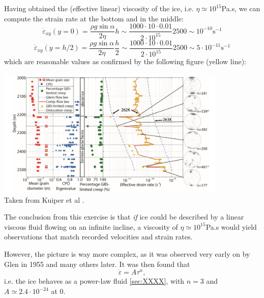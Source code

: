Having obtained the (effective linear) viscosity of the ice, i.e. $\eta\simeq 10^{15}$Pa.s,
we can compute the strain rate at the bottom and in the middle:
\[
\dot{\varepsilon}_{xy}(y=0) 
= \frac{\rho g \sin \alpha}{2 \eta} h
\sim \frac{1000\cdot 10 \cdot 0.01}{2 \cdot 10^{15}}2500
\sim 10^{-10}\text{s}^{-1}
\]
\[
\dot{\varepsilon}_{xy}(y=h/2) 
= \frac{\rho g \sin \alpha}{2 \eta} \frac{h}{2}
\sim \frac{1000\cdot 10 \cdot 0.01}{2 \cdot 10^{15}}2500
\sim 5\cdot 10^{-11}\text{s}^{-1}
\]
which are reasonable values as confirmed by the following figure (yellow line):  
\begin{center}
\includegraphics[width=11cm]{python_codes/fieldstone_59/images/kudd19}\\
{\captionfont Taken from Kuiper et al \cite{kudd19}.}
\end{center}

The conclusion from this exercise is that {\sl if} ice could be described by 
a linear viscous fluid flowing on an infinite incline, a viscosity of $\eta\simeq 10^{15}$Pa.s
would yield observations that match recorded velocities and strain rates. 

However, the picture is way more complex, as it was observed very early on 
by Glen in 1955 \cite{glen55} and many others later. It was then found that 
\[
\dot{\varepsilon} = A \tau^n,
\]
i.e. the ice behaves as a power-law fluid \ref{sec:XXXX}, with 
$n=3$ and $A\simeq 2.4\cdot 10^{-24}$ at 0\degree.

